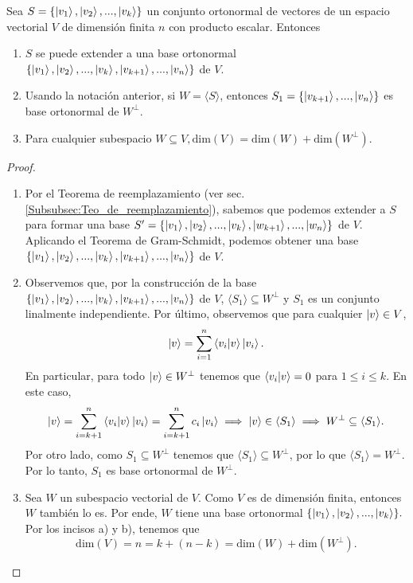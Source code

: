 \documentclass[12pt,dvipsnames]{article}
\newenvironment{teorema}[2][Teorema]{\begin{trivlist}
\item[\hskip \labelsep {\bfseries #1}\hskip \labelsep {\bfseries #2.}]}{\end{trivlist}}
\begin{document}
\begin{teorema} {13.3.3}
    Sea $S=\{\ket{v_1},\ket{v_2},...,\ket{v_k}\}$ un conjunto ortonormal de vectores de un espacio vectorial $V$ de dimensión finita $n$ con producto escalar. Entonces
    \begin{enumerate}[label=\alph*)]  
    \item $S$ se puede extender a una base ortonormal $\{\ket{v_1},\ket{v_2},...,\ket{v_k},\ket{v_{k+1}},...,\ket{v_n}\}$ de $V$.
    \item Usando la notación anterior, si $W=\langle S \rangle$, entonces $S_1=\{\ket{v_{k+1}},...,\ket{v_n}\}$ es base ortonormal de $W^{\perp}$. 
    \item Para cualquier subespacio $W \subseteq V, \text{dim}(V) = \text{dim}(W) + \text{dim}(W^{\perp}).$
    \end{enumerate}
    \begin{proof}
        \begin{enumerate}[label=\alph*)]
            \item Por el Teorema de reemplazamiento (ver sec. \ref{Subsubsec:Teo_de_reemplazamiento}), sabemos que podemos extender a $S$ para formar una base $S'=\{\ket{v_1},\ket{v_2},...,\ket{v_k},\ket{w_{k+1}},...,\ket{w_n}\}$ de $V$. Aplicando el Teorema de Gram-Schmidt, podemos obtener una base $\{\ket{v_1},\ket{v_2},...,\ket{v_k},\ket{v_{k+1}},...,\ket{v_n}\}$ de $V$.
            \item Observemos que, por la construcción de la base $\{\ket{v_1},\ket{v_2},...,\ket{v_k},\ket{v_{k+1}},...,\ket{v_n}\}$ de $V$, $\langle S_1 \rangle \subseteq W^{\perp}$ y $S_1$ es un conjunto linalmente independiente. Por último, observemos que para cualquier $\ket{v}\in V$, $$\ket{v}=\sum_{i=1}^n \braket{v_i|v}\ket{v_i}.$$ \noindent En particular, para todo $\ket{v}\in W^\perp$ tenemos que $\braket{v_i|v}=0$ para $1\le i\le k$. En este caso, \[
                \ket{v}=\sum_{i=k+1}^n\braket{v_i|v}\ket{v_i}=\sum_{i=k+1}^n c_i\ket{v_i}\implies \ket{v}\in \langle S_1 \rangle \implies W^\perp \subseteq \langle S_1 \rangle .\] \noindent Por otro lado, como $S_1 \subseteq W^\perp$ tenemos que $\langle S_1 \rangle \subseteq W^\perp$, por lo que $\langle S_1 \rangle = W^\perp.$ Por lo tanto, $S_1$ es base ortonormal de $W^\perp$. 
            \item Sea $W$ un subespacio vectorial de $V$. Como $V$ es de dimensión finita, entonces $W$ también lo es. Por ende, $W$ tiene una base ortonormal $\{\ket{v_1},\ket{v_2},...,\ket{v_k}\}.$ Por los incisos a) y b), tenemos que \[
                    \text{dim}(V) = n = k + (n-k) = \text{dim}(W) + \text{dim}(W^\perp).\]  
        \end{enumerate}
    \end{proof}
\end{teorema}
\end{document}
